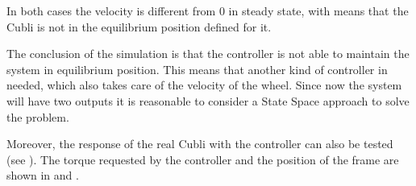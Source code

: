In both cases the velocity is different from 0 in steady state, with means that the Cubli is not in the equilibrium position defined for it. 

The conclusion of the simulation is that the controller is not able to maintain the system in equilibrium position. This means that another kind of controller in needed, which also takes care of the velocity of the wheel. Since now the system will have two outputs it is reasonable to consider a State Space approach to solve the problem.

Moreover, the response of the real Cubli with the controller can also be tested (see ). The torque requested by the controller and the position of the frame are shown in  and .

